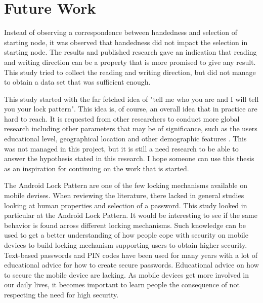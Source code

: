 
  \clearpage
  \section{Future Work}

    Instead of observing a correspondence between handedness and selection of starting node, it was observed that handedness did not impact the selection in starting node. The results and published research gave an indication that reading and writing direction can be a property that is more promised to give any result. This study tried to collect the reading and writing direction, but did not manage to obtain a data set that was sufficient enough. 

    This study started with the far fetched idea of "tell me who you are and I will tell you your lock pattern". This idea is, of course, an overall idea that in practice are hard to reach. It is requested from other researchers to conduct more global research including other parameters that may be of significance, such as the users educational level, geographical location and other demographic features \cite{Andriotis}. This was not managed in this project, but it is still a need research to be able to answer the hypothesis stated in this research. I hope someone can use this thesis as an inspiration for continuing on the work that is started. 

    The Android Lock Pattern are one of the few locking mechanisms available on mobile devises. When reviewing the literature, there lacked in general studies looking at human properties and selection of a password. This study looked in particular at the Android Lock Pattern. It would be interesting to see if the same behavior is found across different locking mechanisms. Such knowledge can be used to get a better understanding of how people cope with security on mobile devices to build locking mechanism supporting users to obtain higher security. Text-based passwords and PIN codes have been used for many years with a lot of educational advice for how to create secure passwords. Educational advice on how to secure the mobile device are lacking. As mobile devices get more involved in our daily lives, it becomes important to learn people the consequence of not respecting the need for high security. 

    


